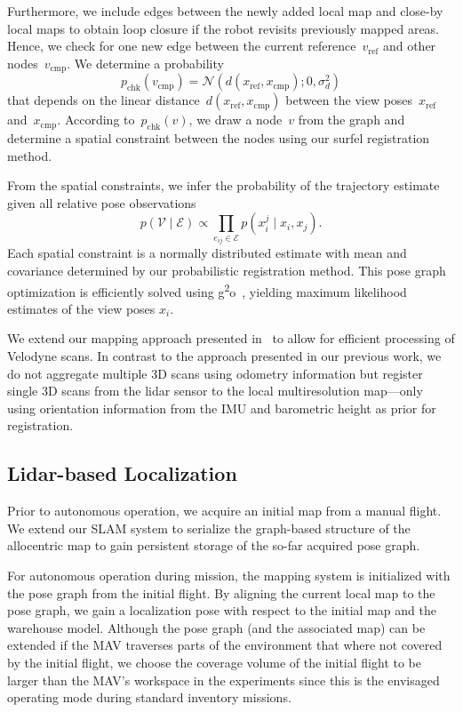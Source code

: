 Furthermore, we include edges between the newly added local map and close-by local maps to obtain loop closure if the robot revisits previously mapped areas. 
Hence, we check for one new edge between the current reference~$v_{\text{ref}}$ and other nodes~$v_{\text{cmp}}$.
We determine a probability
\begin{equation*}
  p_\text{chk}(v_{\text{cmp}}) = \mathcal{N}\left(d(x_{\text{ref}}, x_{\text{cmp}}); 0, \sigma_d^2\right)
\end{equation*}
that depends on the linear distance~$d(x_{\text{ref}}, x_{\text{cmp}})$ between the view poses~$x_{\text{ref}}$ and~$x_{\text{cmp}}$.
According to~$p_\text{chk}(v)$, we draw a node~$v$ from the graph and determine a spatial constraint between the nodes using our surfel registration method.

From the spatial constraints, we infer the probability of the trajectory estimate given all relative pose observations
\begin{equation*}
 p( \mathcal{V} \mid \mathcal{E} ) \propto \prod_{e_{ij} \in \mathcal{E}} p( x_i^j \mid x_i, x_j ).
\end{equation*}
Each spatial constraint is a normally distributed estimate with mean and covariance determined by our probabilistic registration method.
This pose graph optimization is efficiently solved using g\textsuperscript{2}o~\cite{kuemmerle2011_g2o}, yielding maximum likelihood estimates of the view poses $x_i$.

We extend our mapping approach presented in~\cite{Droeschel2017104} to allow for efficient processing of Velodyne scans.
In contrast to the approach presented in our previous work, we do not aggregate multiple 3D scans using odometry information but register 
single 3D scans from the lidar sensor to the local multiresolution map---only using orientation information from the IMU and barometric height as prior for registration. 

\subsection{Lidar-based Localization}
\label{sec:Lidar_based_Localization}
Prior to autonomous operation, we acquire an initial map from a manual flight. We extend our SLAM system to serialize the graph-based structure of the allocentric map to gain persistent storage of the so-far acquired pose graph.

For autonomous operation during mission, the mapping system is initialized with the pose graph from the initial flight. By aligning the current local map to the pose graph, we gain a localization pose with 
respect to the initial map and the warehouse model. Although the pose graph (and the associated map) can be extended if the MAV traverses parts of the environment that where not covered by the initial flight, 
we choose the coverage volume of the initial flight to be larger than the MAV's workspace in the experiments since this is the envisaged operating mode during standard inventory missions.

